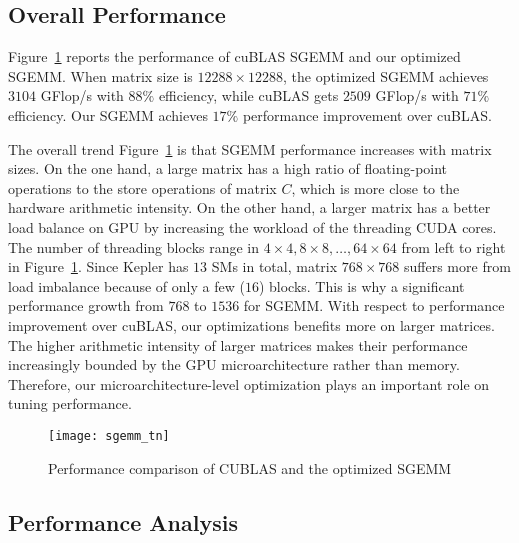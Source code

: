 \subsection{Overall Performance}
Figure~\ref{fig:sgemm_tn} reports the performance of cuBLAS SGEMM and our optimized SGEMM.
When matrix size is $12288\times12288$, the optimized SGEMM achieves $3104$ GFlop/s with $88\%$ efficiency, while cuBLAS gets $2509$ GFlop/s with $71\%$ efficiency. 
Our SGEMM achieves $17\%$ performance improvement over cuBLAS.

The overall trend Figure~\ref{fig:sgemm_tn} is that SGEMM performance increases with matrix sizes. 
On the one hand, a large matrix has a high ratio of 
floating-point operations to the store operations of matrix $C$, which is more close to the hardware arithmetic intensity. 
On the other hand, a larger matrix has a better load balance on GPU by increasing the workload of the threading CUDA
cores.
The number of threading blocks range in $4 \times 4, 8 \times 8, \dots, 64 \times 64$ from left to right in Figure~\ref{fig:sgemm_tn}.
Since Kepler has $13$ SMs in total, matrix $768\times 768$ suffers more from load imbalance because of only a few ($16$) blocks. 
This is why a significant performance growth from $768$ to $1536$ for SGEMM. 
With respect to performance improvement over cuBLAS, our optimizations benefits more on larger matrices. 
The higher arithmetic intensity of larger matrices makes their performance increasingly bounded by the GPU microarchitecture rather than memory. 
Therefore, our microarchitecture-level optimization plays an important role on tuning 
performance.

\begin{figure}[htbp]
\begin{center}
\texttt{[image: sgemm\_tn]}
\caption{Performance comparison of CUBLAS and the optimized SGEMM }
\label{fig:sgemm_tn}
\end{center}
\end{figure}

\subsection{Performance Analysis}

